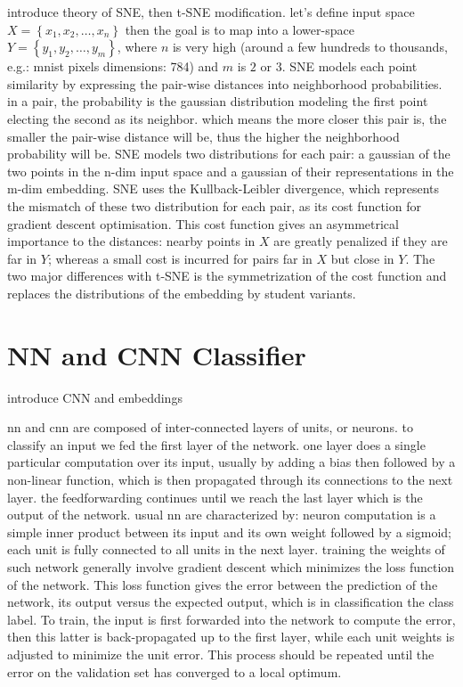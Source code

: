 \documentclass[a4paper,12pt]{report}
\newcommand{\eg}{e.g.}
\begin{document}
introduce theory of SNE, then t-SNE modification.
let's define input space $X = \left\{ x_1, x_2, \dots, x_n \right\}$ then the goal is to map into a lower-space $Y = \left\{ y_1, y_2, \dots, y_m \right\}$, where $n$ is very high (around a few hundreds to thousands, \eg: mnist pixels dimensions: 784) and $m$ is $2$ or $3$.
SNE models each point similarity by expressing the pair-wise distances into neighborhood probabilities.
in a pair, the probability is the gaussian distribution modeling the first point electing the second as its neighbor.
which means the more closer this pair is, the smaller the pair-wise distance will be, thus the higher the neighborhood probability will be.
SNE models two distributions for each pair: a gaussian of the two points in the n-dim input space and a gaussian of their representations in the m-dim embedding.
SNE uses the Kullback-Leibler divergence, which represents the mismatch of these two distribution for each pair, as its cost function for gradient descent optimisation.
This cost function gives an asymmetrical importance to the distances: nearby points in $X$ are greatly penalized if they are far in $Y$; whereas a small cost is incurred for pairs far in $X$ but close in $Y$.
The two major differences with t-SNE is the symmetrization of the cost function and replaces the distributions of the embedding by student variants.

\section{NN and CNN Classifier}
introduce CNN and embeddings

nn and cnn are composed of inter-connected layers of units, or neurons.
to classify an input we fed the first layer of the network.
one layer does a single particular computation over its input, usually by adding a bias then followed by a non-linear function, which is then propagated through its connections to the next layer.
the feedforwarding continues until we reach the last layer which is the output of the network.
usual nn are characterized by: neuron computation is a simple inner product between its input and its own weight followed by a sigmoid; each unit is fully connected to all units in the next layer.
training the weights of such network generally involve gradient descent which minimizes the loss function of the network.
This loss function gives the error between the prediction of the network, its output versus the expected output, which is in classification the class label.
To train, the input is first forwarded into the network to compute the error, then this latter is back-propagated up to the first layer, while each unit weights is adjusted to minimize the unit error.
This process should be repeated until the error on the validation set has converged to a local optimum.
\end{document}
